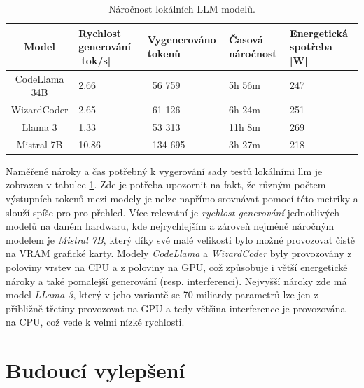 \documentclass[czech, ma, kiv, he, iso690alph, pdf, viewonly]{fasthesis}
\begin{document}
    \begin{table}[H]
        \begin{tabular}{|c|p{2.5cm}|p{2.5cm}|p{3cm}|p{2cm}|}
            \hline
            \textbf{Model} & \textbf{Rychlost \linebreak generování} [tok/s] & \textbf{Vygenerováno tokenů} & \textbf{Časová \linebreak náročnost} & \textbf{Energetická spotřeba} [W] \\
            \hline
            CodeLlama 34B & 2.66 & 56 759 & 5h 56m & 247 \\
            \hline
            WizardCoder & 2.65 & 61 126 & 6h 24m & 251 \\
            \hline
            Llama 3 & 1.33 & 53 313 & 11h 8m & 269 \\
            \hline
            Mistral 7B & 10.86 & 134 695 & 3h 27m & 218 \\
            \hline
        \end{tabular}
        \centering
        \caption{Náročnost lokálních LLM modelů.}
        \label{tab:eval:local}
    \end{table}
 
    Naměřené nároky a čas potřebný k vygerování sady testů lokálními \Gls{llm} je zobrazen v tabulce \ref{tab:eval:local}. Zde je potřeba upozornit na fakt, že různým počtem výstupních tokenů mezi modely je nelze napřímo srovnávat pomocí této metriky a slouží spíše pro pro přehled. Více relevatní je \textit{rychlost generování} jednotlivých modelů na daném hardwaru, kde nejrychlejším a zároveň nejméně náročným modelem je \textit{Mistral 7B}, který díky své malé velikosti bylo možné provozovat čistě na VRAM grafické karty. Modely \textit{CodeLlama} a \textit{WizardCoder} byly provozovány z poloviny vrstev na CPU a z poloviny na GPU, což způsobuje i větší energetické nároky a také pomalejší generování (resp. interferenci). Nejvyšší nároky zde má model \textit{LLama 3}, který v jeho variantě se 70 miliardy parametrů lze jen z přibližně třetiny provozovat na GPU a tedy většina interference je provozována na CPU, což vede k velmi nízké rychlosti.

\chapter{Budoucí vylepšení}
\end{document}

